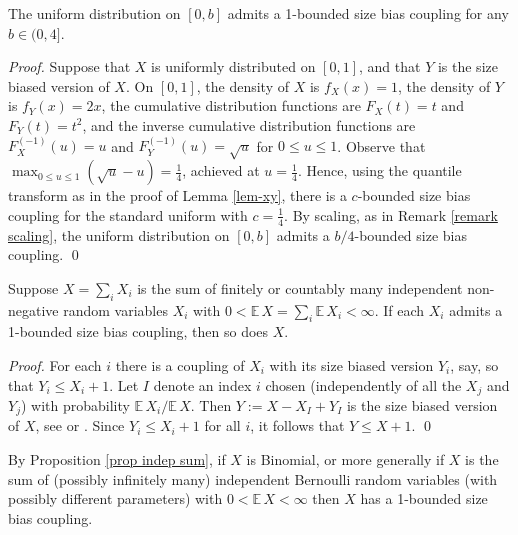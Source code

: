 \documentclass[smallextended,envcountsect]{svjour3}
\begin{document}
\begin{example} \label{example uniform}
The uniform distribution on $[0,b]$ admits a 1-bounded size bias coupling for any $b \in (0,4]$.
\end{example}
\begin{proof}
Suppose that $X$ is uniformly distributed on $[0,1]$, and that $Y$ is the size biased version of $X$.  On $[0,1]$,
the density of $X$ is $f_X(x)=1$, the density of $Y$ is $f_Y(x)=2x$, the cumulative distribution functions are  $F_X(t)=t$ and $F_Y(t)=t^2$, and the inverse cumulative distribution functions are $F_X^{(-1)}(u)=u$ and $F_Y^{(-1)}(u)=\sqrt{u}$ for $0 \le u \le 1$.  Observe that $\max_{0 \le u \le 1} (\sqrt{u}-u) = \frac{1}4$, achieved at $u=\frac{1}4$.  Hence, using the quantile transform as in the proof of Lemma \ref{lem-xy}, there is a $c$-bounded size bias coupling for the standard uniform with  $c=\frac{1}4$.  By scaling, as in Remark \ref{remark scaling}, the uniform distribution on $[0,b]$ admits a $b/4$-bounded size bias coupling.
\qed \end{proof}

\begin{proposition} \label{prop indep sum}  Suppose $X = \sum_{i} X_i$ is the sum of finitely or countably many independent non-negative random variables $X_i$ with $0 < {\mathbb{E \,}} X = \sum_i {\mathbb{E \,}} X_i <\infty$.  If each $X_i$ admits a 1-bounded size bias coupling, then so does $X$.
\end{proposition}
\begin{proof}  For each $i$ there is a coupling of $X_i$ with its size biased version $Y_i$, say, so that $Y_i \le X_i+1$.  Let $I$ denote an index $i$ chosen (independently of all the $X_j$ and $Y_j$) with probability ${\mathbb{E \,}} X_i/{\mathbb{E \,}} X$.  Then $Y:=X-X_I+Y_I$ is the size biased version of $X$, see \cite[Lemma 2.1]{GR96} or \cite[Sect. 2.4]{AGK}.  Since $Y_i \le X_i +1$ for all $i$, it follows that $Y \le X+1$.
\qed \end{proof}

\begin{example} \label{example binomial}  By Proposition \ref{prop indep sum}, if $X$ is Binomial, or more generally if $X$ is the sum of (possibly infinitely many) independent Bernoulli random variables (with possibly different parameters) with $0 < {\mathbb{E \,}} X < \infty$ then $X$ has a 1-bounded size bias coupling.
\end{example}
\end{document}
